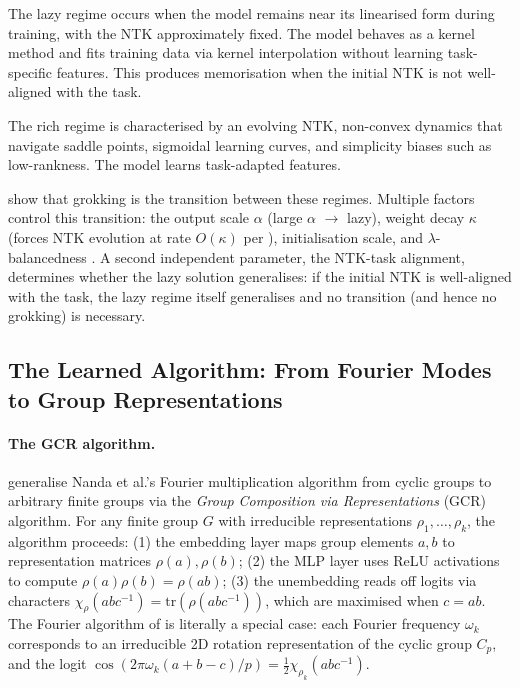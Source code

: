 \documentclass[11pt,a4paper]{article}
\begin{document}
The lazy regime \citep{chizat2019lazy, jacot2018neural} occurs when the model remains near its linearised form during training, with the NTK approximately fixed. The model behaves as a kernel method and fits training data via kernel interpolation without learning task-specific features. This produces memorisation when the initial NTK is not well-aligned with the task.

The rich regime \citep{saxe2014exact, domine2025lazy} is characterised by an evolving NTK, non-convex dynamics that navigate saddle points, sigmoidal learning curves, and simplicity biases such as low-rankness. The model learns task-adapted features.

\citet{kumar2024grokking} show that grokking is the transition between these regimes. Multiple factors control this transition: the output scale $\alpha$ (large $\alpha$ $\to$ lazy), weight decay $\kappa$ (forces NTK evolution at rate $O(\kappa)$ per \citet{lewkowycz2020large}), initialisation scale, and $\lambda$-balancedness \citep{domine2025lazy}. A second independent parameter, the NTK-task alignment, determines whether the lazy solution generalises: if the initial NTK is well-aligned with the task, the lazy regime itself generalises and no transition (and hence no grokking) is necessary.

\subsection{The Learned Algorithm: From Fourier Modes to Group Representations}\label{sec:background_algo}

\paragraph{The GCR algorithm.} \citet{chughtai2023toy} generalise Nanda et al.'s Fourier multiplication algorithm from cyclic groups to arbitrary finite groups via the \emph{Group Composition via Representations} (GCR) algorithm. For any finite group $G$ with irreducible representations $\rho_1, \ldots, \rho_k$, the algorithm proceeds: (1) the embedding layer maps group elements $a, b$ to representation matrices $\rho(a), \rho(b)$; (2) the MLP layer uses ReLU activations to compute $\rho(a)\rho(b) = \rho(ab)$; (3) the unembedding reads off logits via characters $\chi_\rho(abc^{-1}) = \mathrm{tr}(\rho(abc^{-1}))$, which are maximised when $c = ab$. The Fourier algorithm of \citet{nanda2023progress} is literally a special case: each Fourier frequency $\omega_k$ corresponds to an irreducible 2D rotation representation of the cyclic group $C_p$, and the logit $\cos(2\pi\omega_k(a+b-c)/p) = \frac{1}{2}\chi_{\rho_k}(abc^{-1})$.
\end{document}
